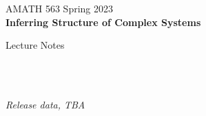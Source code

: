 \documentclass[11pt]{book} %
\begin{document}

\begingroup
\thispagestyle{empty}
\centering
\vspace*{5cm}
\par\normalfont\sffamily\selectfont
{\Large AMATH 563 Spring 2023}\\
\textbf{\Huge Inferring Structure of Complex Systems}\par %
\vspace*{1cm}
{\Huge Lecture Notes}\par %
\endgroup


\newpage
~\vfill
\thispagestyle{empty}




\noindent \\ %

\noindent \textit{Release data, TBA} %



\pagestyle{empty} %

\tableofcontents %


\pagestyle{fancy} %

\end{document}
